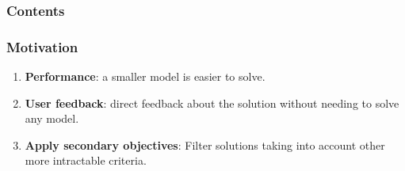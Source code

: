 

\begin{frame}
\frametitle{\textbf{Contents}}
  \begin{block}{\textbf{\secondtitleF}}
  \end{block}  

  \begin{block}{\textbf{\secondtitleS}}
  \end{block}  
\end{frame}

\begin{frame}
\frametitle{\textbf{Motivation}}
  
  \pause
  \begin{enumerate}[<+->]

  \item
    \textbf{Performance}: a smaller model is easier to solve.
  \item
    \textbf{User feedback}: direct feedback about the solution without
    needing to solve any model.
  \item
    \textbf{Apply secondary objectives}: Filter solutions taking into account other more intractable criteria.
  \end{enumerate}
\end{frame}

